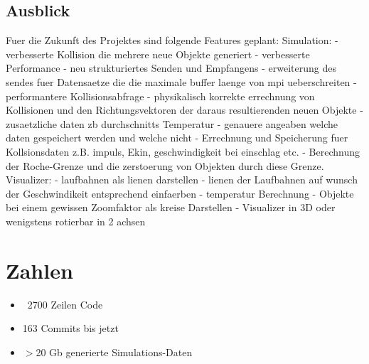\subsection{Ausblick}
Fuer die Zukunft des Projektes sind folgende Features geplant:
    Simulation:
        - verbesserte Kollision die mehrere neue Objekte generiert
        - verbesserte Performance
        - neu strukturiertes Senden und Empfangens
        - erweiterung des sendes fuer Datensaetze die die maximale
          buffer laenge von mpi ueberschreiten
        - performantere Kollisionsabfrage
        - physikalisch korrekte errechnung von Kollisionen und den
          Richtungsvektoren der daraus resultierenden neuen Objekte
        - zusaetzliche daten zb durchschnitts Temperatur
        - genauere angeaben welche daten gespeichert werden und welche nicht
        - Errechnung und Speicherung fuer Kollsionsdaten z.B. impuls, Ekin,
          geschwindigkeit bei einschlag etc.
        - Berechnung der Roche-Grenze und die zerstoerung von Objekten 
          durch diese Grenze.
    Visualizer:
        - laufbahnen als lienen darstellen
        - lienen der Laufbahnen auf wunsch der Geschwindikeit entsprechend
          einfaerben
        - temperatur Berechnung
        - Objekte bei einem gewissen Zoomfaktor als kreise Darstellen
        - Visualizer in 3D oder wenigstens rotierbar in 2 achsen

\section{Zahlen}
\begin{itemize}
    \item ~2700 Zeilen Code
    \item 163 Commits bis jetzt
    \item $>$20 Gb generierte Simulations-Daten
\end{itemize}


